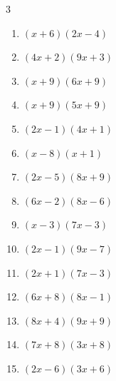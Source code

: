 \begin{multicols}{3}
\begin{enumerate}
  \item $(x+6)(2x-4)$


  \item $(4x+2)(9x+3)$


\columnbreak %

  \item $(x+9)(6x+9)$


  \item $(x+9)(5x+9)$


  \item $(2x-1)(4x+1)$


  \item $(x-8)(x+1)$


  \item $(2x-5)(8x+9)$


  \item $(6x-2)(8x-6)$


  \item $(x-3)(7x-3)$


  \item $(2x-1)(9x-7)$


  \item $(2x+1)(7x-3)$


  \item $(6x+8)(8x-1)$


  \item $(8x+4)(9x+9)$


  \item $(7x+8)(3x+8)$


  \item $(2x-6)(3x+6)$


\end{enumerate}
\end{multicols}
